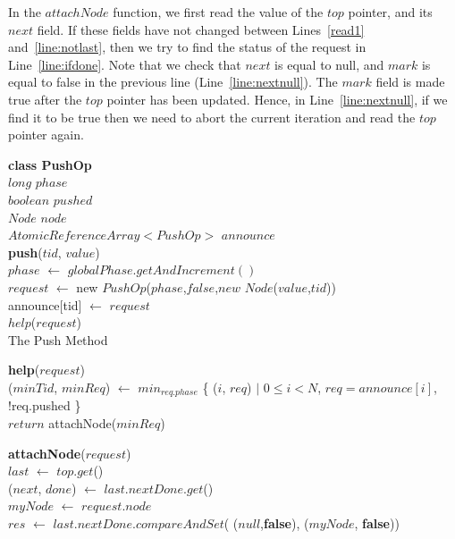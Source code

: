 \documentclass{llncs}
\begin{document}
In the $attachNode$ function, we first read the value of the $top$ pointer, and its $next$ field. 
If these fields have not changed between Lines~\ref{read1} and~\ref{line:notlast}, then we try to find the status of the request in Line~\ref{line:ifdone}. 
Note that we check that $next$ is equal to null, and $mark$ is equal to false in the previous line 
(Line~\ref{line:nextnull}). The $mark$ field is made true after the $top$ pointer has been updated. Hence, in 
Line~\ref{line:nextnull}, if we find it to be true then we need to abort the current iteration and read the 
$top$ pointer again.
\vspace{-6mm}
\begin{algorithm}[!htb]
\scriptsize
\SetAlgoLined

\textbf{class PushOp}{}\\
		\hspace{5mm}$long$ $phase$\\
		\hspace{5mm}$boolean$ $pushed$\\
		\hspace{5mm}$Node$ $node$\\
$AtomicReferenceArray<PushOp>$ $announce$\\
\textbf{push}($tid$, $value$){} \label{line:push}\\
		$phase$ $\leftarrow$ $globalPhase.getAndIncrement()$\\
		$request$ $\leftarrow$ new $PushOp$($phase$,$false$,$new$ $Node$($value$,$tid$)) \\
		announce[tid] $\leftarrow$ $request$\\
		$help$($request$)\\


\caption{The Push Method} \label{alg:PushOp}



\SetAlgoLined
\textbf{help}($request$){} \label{line:help}\\
		($minTid$, $minReq$)  $\leftarrow$ $min_{req.phase}$ \{ ($i$, $req$) $\mid$ $0 \le i < N$, $req = announce[i]$,
!req.pushed  \} \\
		 {
			$return$ 
		}
		attachNode($minReq$) \\




\scriptsize
\SetAlgoLined	
\textbf{attachNode}($request$){}\\
		{
			$last$ $\leftarrow$ $top.get$()\\
			($next$, $done$) $\leftarrow$ $last.nextDone.get$()\\ \label{read1}
			{
				{
					{
						$myNode$ $\leftarrow$ $request.node$\\
						$res$ $\leftarrow$ $last.nextDone.compareAndSet$( ($null$,\textbf{false}), ($myNode$, \textbf{false})) \label{line:pushcas} \\
						
}}}}
\end{algorithm}
\end{document}
